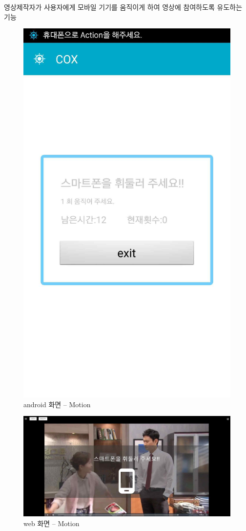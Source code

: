 \documentclass[chapter,oneside]{oblivoir}
\begin{document}
\begin{enumerate}
    영상제작자가 사용자에게 모바일 기기를 움직이게 하여 영상에 참여하도록 유도하는 기능
    \begin{figure}[h!]
    \centering
    \includegraphics{pic/chp7/img1030}
    \caption{android 화면 – Motion}
    \end{figure}
    \begin{figure}[h!]
    \centering
    \includegraphics{pic/chp7/img1031}
    \caption{web 화면 – Motion}
    \end{figure} 


\end{enumerate}
\end{document}
